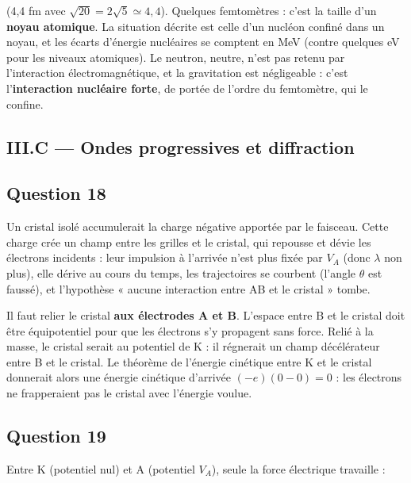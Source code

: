 \documentclass[11pt,a4paper]{article}
\newcommand{\equationajustee}[1]{%
  \sbox{\boiteequation}{$\displaystyle #1$}%
  \ifdim\wd\boiteequation>\linewidth
    \[\resizebox{\linewidth}{!}{\usebox{\boiteequation}}\]%
  \else
    \[#1\]%
  \fi}
\begin{document}
\equationajustee{\boxed{\ell\simeq4{,}5\cdot10^{-15}\ \mathrm m}}

(4,4 fm avec \(\sqrt{20}=2\sqrt5\simeq4{,}4\)). Quelques femtomètres : c'est la taille d'un \textbf{noyau atomique}. La situation décrite est celle d'un nucléon confiné dans un noyau, et les écarts d'énergie nucléaires se comptent en MeV (contre quelques eV pour les niveaux atomiques). Le neutron, neutre, n'est pas retenu par l'interaction électromagnétique, et la gravitation est négligeable : c'est l'\textbf{interaction nucléaire forte}, de portée de l'ordre du femtomètre, qui le confine.

\hypertarget{iii.c-ondes-progressives-et-diffraction}{%
\subsection{III.C --- Ondes progressives et diffraction}\label{iii.c-ondes-progressives-et-diffraction}}

\hypertarget{question-18}{%
\subsection{Question 18}\label{question-18}}

Un cristal isolé accumulerait la charge négative apportée par le faisceau. Cette charge crée un champ entre les grilles et le cristal, qui repousse et dévie les électrons incidents : leur impulsion à l'arrivée n'est plus fixée par \(V_A\) (donc \(\lambda\) non plus), elle dérive au cours du temps, les trajectoires se courbent (l'angle \(\theta\) est faussé), et l'hypothèse « aucune interaction entre AB et le cristal » tombe.

Il faut relier le cristal \textbf{aux électrodes A et B}. L'espace entre B et le cristal doit être équipotentiel pour que les électrons s'y propagent sans force. Relié à la masse, le cristal serait au potentiel de K : il régnerait un champ décélérateur entre B et le cristal. Le théorème de l'énergie cinétique entre K et le cristal donnerait alors une énergie cinétique d'arrivée \((-e)(0-0)=0\) : les électrons ne frapperaient pas le cristal avec l'énergie voulue.

\hypertarget{question-19}{%
\subsection{Question 19}\label{question-19}}

Entre K (potentiel nul) et A (potentiel \(V_A\)), seule la force électrique travaille :
\end{document}
